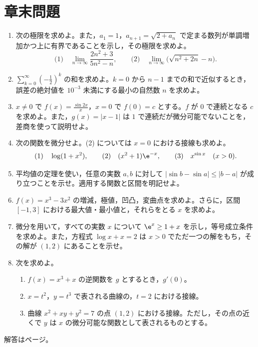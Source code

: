 \section*{章末問題}
\begin{enumerate}[label=\textbf{\thechapter.\arabic*},leftmargin=*]
 \item\label{問:極限と漸化式} 次の極限を求めよ。また，$a_1=1$，$a_{n+1}=\sqrt{2+a_n}$ で定まる数列が単調増加かつ上に有界であることを示し，その極限を求めよ。
 \[
  \text{(1)}\quad\lim_{n\to\infty}\frac{2n^2+3}{5n^2-n},
  \qquad
  \text{(2)}\quad\lim_{n\to\infty}\bigl(\sqrt{n^2+2n}-n\bigr).
 \]
 \item\label{問:等比誤差} $\sum_{k=0}^{\infty}\left(-\frac12\right)^k$ の和を求めよ。$k=0$ から $n-1$ までの和で近似するとき，誤差の絶対値を $10^{-3}$ 未満にする最小の自然数 $n$ を求めよ。
 \item\label{問:連続と微分可能} $x\ne0$ で $f(x)=\frac{\sin2x}{x}$，$x=0$ で $f(0)=c$ とする。$f$ が $0$ で連続となる $c$ を求めよ。また，$g(x)=|x-1|$ は $1$ で連続だが微分可能でないことを，差商を使って説明せよ。
 \item\label{問:微分計算} 次の関数を微分せよ。(2) については $x=0$ における接線も求めよ。
 \[
  \text{(1)}\quad\log(1+x^2),\qquad
  \text{(2)}\quad(x^2+1)\e^{-x},\qquad
  \text{(3)}\quad x^{\sin x}\quad(x>0).
 \]
 \item\label{問:平均値評価} 平均値の定理を使い，任意の実数 $a,b$ に対して $|\sin b-\sin a|\le|b-a|$ が成り立つことを示せ。適用する関数と区間を明記せよ。
 \item\label{問:三次関数グラフ} $f(x)=x^3-3x^2$ の増減，極値，凹凸，変曲点を求めよ。さらに，区間 $[-1,3]$ における最大値・最小値と，それらをとる $x$ を求めよ。
 \item\label{問:指数不等式方程式} 微分を用いて，すべての実数 $x$ について $\e^x\ge1+x$ を示し，等号成立条件を求めよ。また，方程式 $\log x+x=2$ は $x>0$ でただ一つの解をもち，その解が $(1,2)$ にあることを示せ。
 \item\label{問:逆媒介陰} 次を求めよ。
 \begin{enumerate}[label=(\arabic*),leftmargin=*]
  \item $f(x)=x^3+x$ の逆関数を $g$ とするとき，$g'(0)$。
  \item $x=t^2$，$y=t^3$ で表される曲線の，$t=2$ における接線。
  \item 曲線 $x^2+xy+y^2=7$ の点 $(1,2)$ における接線。ただし，その点の近くで $y$ は $x$ の微分可能な関数として表されるものとする。
 \end{enumerate}
\end{enumerate}

\smallskip\noindent 解答は\pageref{解答:第2章}ページ。
